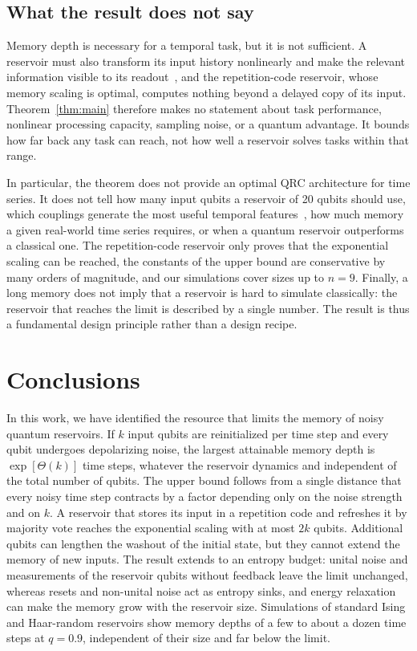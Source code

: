 \documentclass[aps,pra,reprint,superscriptaddress,floatfix]{revtex4-2}
\theoremstyle{plain}
\begin{document}
\subsection{What the result does not say}

Memory depth is necessary for a temporal task, but it is not sufficient. A reservoir must also transform its input history nonlinearly and make the relevant information visible to its readout~\cite{Cao2026}, and the repetition-code reservoir, whose memory scaling is optimal, computes nothing beyond a delayed copy of its input. Theorem~\ref{thm:main} therefore makes no statement about task performance, nonlinear processing capacity, sampling noise, or a quantum advantage. It bounds how far back any task can reach, not how well a reservoir solves tasks within that range.

In particular, the theorem does not provide an optimal QRC architecture for time series. It does not tell how many input qubits a reservoir of 20 qubits should use, which couplings generate the most useful temporal features~\cite{MartinezPena2021,Cao2026}, how much memory a given real-world time series requires, or when a quantum reservoir outperforms a classical one. The repetition-code reservoir only proves that the exponential scaling can be reached, the constants of the upper bound are conservative by many orders of magnitude, and our simulations cover sizes up to $n=9$. Finally, a long memory does not imply that a reservoir is hard to simulate classically: the reservoir that reaches the limit is described by a single number. The result is thus a fundamental design principle rather than a design recipe.

\section{Conclusions}
\label{sec:conclusions}

In this work, we have identified the resource that limits the memory of noisy quantum reservoirs. If $k$ input qubits are reinitialized per time step and every qubit undergoes depolarizing noise, the largest attainable memory depth is $\exp[\Theta(k)]$ time steps, whatever the reservoir dynamics and independent of the total number of qubits. The upper bound follows from a single distance that every noisy time step contracts by a factor depending only on the noise strength and on $k$. A reservoir that stores its input in a repetition code and refreshes it by majority vote reaches the exponential scaling with at most $2k$ qubits. Additional qubits can lengthen the washout of the initial state, but they cannot extend the memory of new inputs. The result extends to an entropy budget: unital noise and measurements of the reservoir qubits without feedback leave the limit unchanged, whereas resets and non-unital noise act as entropy sinks, and energy relaxation can make the memory grow with the reservoir size. Simulations of standard Ising and Haar-random reservoirs show memory depths of a few to about a dozen time steps at $q=0.9$, independent of their size and far below the limit.
\end{document}
